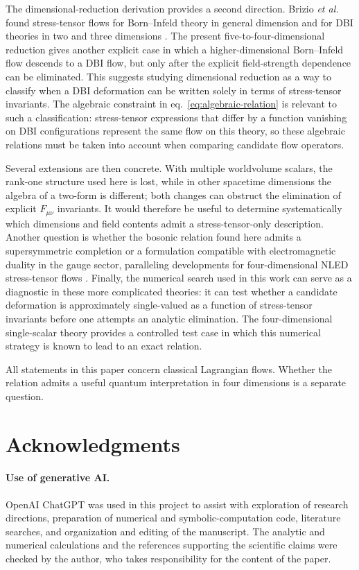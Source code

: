 \documentclass[a4paper,11pt]{article}
\numberwithin{equation}{section}
\begin{document}
The dimensional-reduction derivation provides a second direction. Brizio \textit{et al.} found stress-tensor flows for Born--Infeld theory in general dimension and for DBI theories in two and three dimensions \cite{Brizio2026}. The present five-to-four-dimensional reduction gives another explicit case in which a higher-dimensional Born--Infeld flow descends to a DBI flow, but only after the explicit field-strength dependence can be eliminated. This suggests studying dimensional reduction as a way to classify when a DBI deformation can be written solely in terms of stress-tensor invariants. The algebraic constraint in eq.~\eqref{eq:algebraic-relation} is relevant to such a classification: stress-tensor expressions that differ by a function vanishing on DBI configurations represent the same flow on this theory, so these algebraic relations must be taken into account when comparing candidate flow operators.

Several extensions are then concrete. With multiple worldvolume scalars, the rank-one structure used here is lost, while in other spacetime dimensions the algebra of a two-form is different; both changes can obstruct the elimination of explicit $F_{\mu\nu}$ invariants. It would therefore be useful to determine systematically which dimensions and field contents admit a stress-tensor-only description. Another question is whether the bosonic relation found here admits a supersymmetric completion or a formulation compatible with electromagnetic duality in the gauge sector, paralleling developments for four-dimensional NLED stress-tensor flows \cite{Ferko2023Birefringence,Ferko2023Duality}. Finally, the numerical search used in this work can serve as a diagnostic in these more complicated theories: it can test whether a candidate deformation is approximately single-valued as a function of stress-tensor invariants before one attempts an analytic elimination. The four-dimensional single-scalar theory provides a controlled test case in which this numerical strategy is known to lead to an exact relation.

All statements in this paper concern classical Lagrangian flows. Whether the relation admits a useful quantum interpretation in four dimensions is a separate question.

\section*{Acknowledgments}

\paragraph{Use of generative AI.}
OpenAI ChatGPT was used in this project to assist with exploration of research directions, preparation of numerical and symbolic-computation code, literature searches, and organization and editing of the manuscript. The analytic and numerical calculations and the references supporting the scientific claims were checked by the author, who takes responsibility for the content of the paper.
\end{document}
